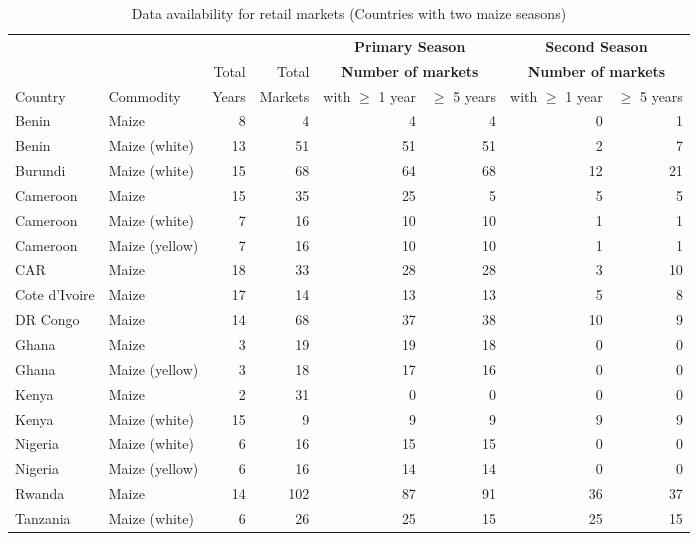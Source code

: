 \begin{table}[ht]
	\centering
	\begin{threeparttable}[t]
		\caption{Data availability for retail markets (Countries with two maize seasons)}
		\label{tab:avail_retail2}
		\begin{tabular}{|ll|rr|rr|rr|}
			\hline
			& &  &  & \multicolumn{2}{c}{\textbf{Primary Season}}  & \multicolumn{2}{c}{\textbf{Second Season}}\\ 
			&  & Total  & Total   & \multicolumn{2}{c}{\textbf{Number of markets}} & \multicolumn{2}{c}{\textbf{Number of markets}} \\ 
			Country & Commodity & Years & Markets & with $\geq$ 1 year & $\geq$ 5 years & with $\geq$ 1 year & $\geq$ 5 years\\ 
			\hline
Benin & Maize &   8 &   4 &   4 &   4 &   0 &   1 \\ 
  Benin & Maize (white) &  13 &  51 &  51 &  51 &   2 &   7 \\ 
  Burundi & Maize (white) &  15 &  68 &  64 &  68 &  12 &  21 \\ 
  Cameroon & Maize &  15 &  35 &  25 &   5 &   5 &   5 \\ 
  Cameroon & Maize (white) &   7 &  16 &  10 &  10 &   1 &   1 \\ 
  Cameroon & Maize (yellow) &   7 &  16 &  10 &  10 &   1 &   1 \\ 
  CAR & Maize &  18 &  33 &  28 &  28 &   3 &  10 \\ 
  Cote d'Ivoire & Maize &  17 &  14 &  13 &  13 &   5 &   8 \\ 
  DR Congo & Maize &  14 &  68 &  37 &  38 &  10 &   9 \\ 
  Ghana & Maize &   3 &  19 &  19 &  18 &   0 &   0 \\ 
  Ghana & Maize (yellow) &   3 &  18 &  17 &  16 &   0 &   0 \\ 
  Kenya & Maize &   2 &  31 &   0 &   0 &   0 &   0 \\ 
  Kenya & Maize (white) &  15 &   9 &   9 &   9 &   9 &   9 \\ 
  Nigeria & Maize (white) &   6 &  16 &  15 &  15 &   0 &   0 \\ 
  Nigeria & Maize (yellow) &   6 &  16 &  14 &  14 &   0 &   0 \\ 
  Rwanda & Maize &  14 & 102 &  87 &  91 &  36 &  37 \\ 
  Tanzania & Maize (white) &   6 &  26 &  25 &  15 &  25 &  15 \\ 

\end{tabular}
\end{threeparttable}
\end{table}
